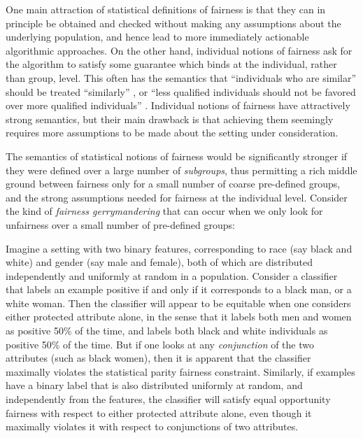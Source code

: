 One main attraction of statistical definitions of fairness is that they can in principle be obtained and checked without making any assumptions about the underlying population, and hence lead to more immediately actionable algorithmic approaches. On the other hand, individual notions of fairness ask for the algorithm to satisfy some guarantee which binds at the individual, rather than group, level. This often has the semantics that ``individuals who are similar'' should be treated ``similarly'' \citep{DworkFairness}, or ``less qualified individuals should not be favored over more qualified individuals'' \citep{JKMR16}. Individual notions of fairness have attractively strong semantics, but their main drawback is that achieving them seemingly requires more assumptions to be made about the setting under consideration.

The semantics of statistical notions of fairness would be significantly stronger if they were defined over a large number of {\em subgroups\/},
thus permitting a rich middle ground between fairness only for a small number of coarse pre-defined groups, and
the strong assumptions needed for fairness at the individual level.
Consider the kind of {\em fairness gerrymandering\/} that can occur when we only look for unfairness over a small number of pre-defined groups:
\begin{example}
\label{example}
Imagine a setting with two binary features, corresponding to race (say black and white) and gender (say male and female), both of which are distributed independently and uniformly at random in a population. Consider a classifier that labels an example positive if and only if it corresponds to a black man, or a white woman. Then the classifier will appear to be equitable when one considers either protected attribute alone, in the sense that it labels both men and women as positive 50\% of the time, and labels both black and white individuals as positive 50\% of the time. But if one looks at any \emph{conjunction} of the two attributes (such as black women), then it is apparent that the classifier maximally violates the statistical parity fairness constraint. Similarly, if examples have a binary label that is also distributed uniformly at random, and independently from the features, the classifier will satisfy equal opportunity fairness with respect to either protected attribute alone, even though it maximally violates it with respect to conjunctions of two attributes.
\end{example}

